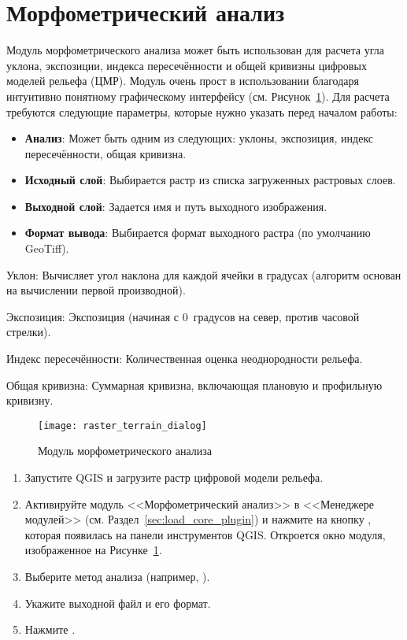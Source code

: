 
\section{Морфометрический анализ}


Модуль морфометрического анализа  может быть использован для расчета
угла уклона, экспозиции, индекса пересечённости и общей кривизны цифровых
моделей рельефа (ЦМР). Модуль очень прост в использовании благодаря
интуитивно понятному графическому интерфейсу
(см. Рисунок~\ref{fig:raster_terrain_dialog}). Для расчета требуются
следующие параметры, которые нужно указать перед началом работы:

\begin{itemize}[label=--]
\item \textbf{Анализ}: Может быть одним из следующих: уклоны,
экспозиция, индекс пересечённости, общая кривизна.
\item \textbf{Исходный слой}: Выбирается растр из списка загруженных растровых
слоев.
\item \textbf{Выходной слой}: Задается имя и путь выходного изображения.
\item \textbf{Формат вывода}: Выбирается формат выходного растра (по
умолчанию GeoTiff).
\end{itemize}

Уклон: Вычисляет угол наклона для каждой ячейки в градусах (алгоритм
основан на вычислении первой производной).

Экспозиция: Экспозиция (начиная с 0~градусов на север, против часовой стрелки).

Индекс пересечённости: Количественная оценка неоднородности рельефа.

Общая кривизна: Суммарная кривизна, включающая плановую и профильную кривизну.

\begin{figure}[ht]
   \centering
   \texttt{[image: raster\_terrain\_dialog]}
   \caption{Модуль морфометрического анализа \wincaption}\label{fig:raster_terrain_dialog}
\end{figure}

\label{raster_terrain_usage}

\begin{enumerate}
  \item Запустите QGIS и загрузите растр цифровой модели рельефа.
  \item Активируйте модуль <<Морфометрический анализ>> в <<Менеджере модулей>>
  (см. Раздел~\ref{sec:load_core_plugin}) и нажмите на кнопку
  , которая появилась
  на панели инструментов QGIS. Откроется окно модуля, изображенное на
  Рисунке~\ref{fig:raster_terrain_dialog}.
  \item Выберите метод анализа (например, ).
  \item Укажите выходной файл и его формат.
  \item Нажмите .
\end{enumerate}

\FloatBarrier
